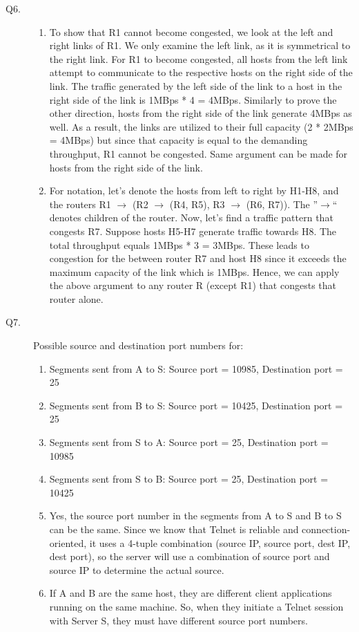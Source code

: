 \documentclass{csc_assignment}
\begin{document}
\begin{description}
\item[Q6.]
\begin{enumerate}
\item To show that R1 cannot become congested, we look at the left and right links of R1. We only examine the left link, as it is symmetrical to the right link. For R1 to become congested, all hosts from the left link attempt to communicate to the respective hosts on the right side of the link. The traffic generated by the left side of the link to a host in the right side of the link is 1MBps * 4 = 4MBps. Similarly to prove the other direction, hosts from the right side of the link generate 4MBps as well. As a result, the links are utilized to their full capacity (2 * 2MBps = 4MBps) but since that capacity is equal to the demanding throughput, R1 cannot be congested. Same argument can be made for hosts from the right side of the link.
\item For notation, let's denote the hosts from left to right by H1-H8, and the routers R1 $\rightarrow$ (R2 $\rightarrow$ (R4, R5), R3 $\rightarrow$ (R6, R7)). The ''$\rightarrow$`` denotes children of the router. Now, let's find a traffic pattern that congests R7. Suppose hosts H5-H7 generate traffic towards H8. The total throughput equals 1MBps * 3 = 3MBps. These leads to congestion for the between router R7 and host H8 since it exceeds the maximum capacity of the link which is 1MBps. Hence, we can apply the above argument to any router R (except R1) that congests that router alone. 
\end{enumerate}


\item[Q7.] Possible source and destination port numbers for:
\begin{enumerate}
\item Segments sent from A to S: Source port = 10985, Destination port = 25
\item Segments sent from B to S: Source port = 10425, Destination port = 25
\item Segments sent from S to A: Source port = 25, Destination port = 10985
\item Segments sent from S to B: Source port = 25, Destination port = 10425
\item Yes, the source port number in the segments from A to S and B to S can be the same. Since we know that Telnet is reliable and connection-oriented, it uses a 4-tuple combination (source IP, source port, dest IP, dest port), so the server will use a combination of source port and source IP to determine the actual source.
\item If A and B are the same host, they are different client applications running on the same machine. So, when they initiate a Telnet session with Server S, they must have different source port numbers.
\end{enumerate}


\end{description}
\end{document}
